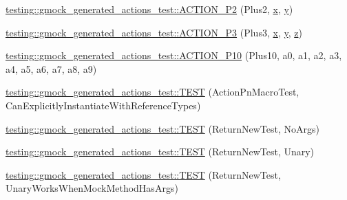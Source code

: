 \begin{DoxyCompactItemize}
\item 
\mbox{\hyperlink{namespacetesting_1_1gmock__generated__actions__test_a0e2768c0fae30bc46ec6e322b29dd54c}{testing\+::gmock\+\_\+generated\+\_\+actions\+\_\+test\+::\+A\+C\+T\+I\+O\+N\+\_\+\+P2}} (Plus2, \mbox{\hyperlink{_obj__test_2lib_2googletest-master_2googlemock_2test_2gmock-matchers__test_8cc_a6150e0515f7202e2fb518f7206ed97dc}{x}}, \mbox{\hyperlink{_obj__test_2lib_2googletest-master_2googlemock_2test_2gmock-matchers__test_8cc_a39cb44155237f0205e0feb931d5acbed}{y}})
\item 
\mbox{\hyperlink{namespacetesting_1_1gmock__generated__actions__test_afc911947c840aa9857eb2d06e4d80787}{testing\+::gmock\+\_\+generated\+\_\+actions\+\_\+test\+::\+A\+C\+T\+I\+O\+N\+\_\+\+P3}} (Plus3, \mbox{\hyperlink{_obj__test_2lib_2googletest-master_2googlemock_2test_2gmock-matchers__test_8cc_a6150e0515f7202e2fb518f7206ed97dc}{x}}, \mbox{\hyperlink{_obj__test_2lib_2googletest-master_2googlemock_2test_2gmock-matchers__test_8cc_a39cb44155237f0205e0feb931d5acbed}{y}}, \mbox{\hyperlink{_obj__test_2lib_2googletest-master_2googlemock_2test_2gmock-matchers__test_8cc_a196ff6a287f53f758b1506f21269fc77}{z}})
\item 
\mbox{\hyperlink{namespacetesting_1_1gmock__generated__actions__test_a4e48e01a7bfc369d279cc0c99a7d3c60}{testing\+::gmock\+\_\+generated\+\_\+actions\+\_\+test\+::\+A\+C\+T\+I\+O\+N\+\_\+\+P10}} (Plus10, a0, a1, a2, a3, a4, a5, a6, a7, a8, a9)
\item 
\mbox{\hyperlink{namespacetesting_1_1gmock__generated__actions__test_a20664d32f08c53d6f9fa5e020a85fab3}{testing\+::gmock\+\_\+generated\+\_\+actions\+\_\+test\+::\+T\+E\+ST}} (Action\+Pn\+Macro\+Test, Can\+Explicitly\+Instantiate\+With\+Reference\+Types)
\item 
\mbox{\hyperlink{namespacetesting_1_1gmock__generated__actions__test_a058a3d17071ddb888319ab71b491af94}{testing\+::gmock\+\_\+generated\+\_\+actions\+\_\+test\+::\+T\+E\+ST}} (Return\+New\+Test, No\+Args)
\item 
\mbox{\hyperlink{namespacetesting_1_1gmock__generated__actions__test_a64f3f8327d51c139b441846e809ae4bc}{testing\+::gmock\+\_\+generated\+\_\+actions\+\_\+test\+::\+T\+E\+ST}} (Return\+New\+Test, Unary)
\item 
\mbox{\hyperlink{namespacetesting_1_1gmock__generated__actions__test_ad8f696b14b0f2dba4986c53f615aef15}{testing\+::gmock\+\_\+generated\+\_\+actions\+\_\+test\+::\+T\+E\+ST}} (Return\+New\+Test, Unary\+Works\+When\+Mock\+Method\+Has\+Args)
\item 

\end{DoxyCompactItemize}
